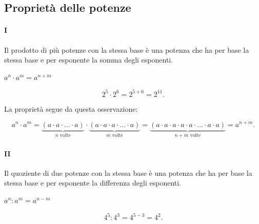 \subsection{Proprietà delle potenze}

\paragraph{I} Il prodotto di più potenze con la stessa base è una 
potenza che ha per base la stessa base e per esponente la somma degli 
esponenti.

\begin{minipage}[h]{.45\textwidth}
\centering
\vspace{4.5mm}
 \(\boxed{a^n\cdot a^m=a^{n+m}}\)
\end{minipage}\hfil
\begin{minipage}[h]{.45\textwidth}
\centering
\[ 2^5\cdot 2^6=2^{5+6}=2^{11}.\]
\end{minipage}
\vspace{.5cm}

La proprietà segue da questa osservazione:
\begin{inaccessibleblock}
\[ a^n\cdot a^m = \underbrace{(a\cdot a\cdot\ldots\cdot a)}_{n\text{ 
volte}}\cdot%
 \underbrace{(a\cdot a\cdot a\cdot\ldots\cdot a)}_{m\text{ volte}}
 =\underbrace{(a\cdot a\cdot a\cdot a\cdot a\cdot\ldots\cdot a\cdot 
a)}_{n+m\text{ volte}}%
 =a^{n+m}.\]
\end{inaccessibleblock}

\paragraph{II} Il quoziente di due potenze con la stessa base è una 
potenza che ha per base la stessa base e per esponente la differenza degli 
esponenti.

\begin{minipage}[h]{.45\textwidth}
\centering
\vspace{4.5mm}
  \(\boxed{a^n:a^m=a^{n-m}}\)
\end{minipage}\hfil
\begin{minipage}[h]{.45\textwidth}
\centering
\[4^5:4^3=4^{5-3}=4^2.\]
\end{minipage}
\vspace{.5cm}

